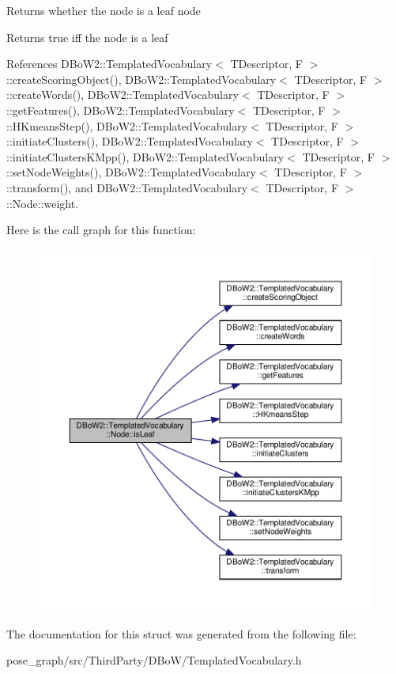 Returns whether the node is a leaf node \begin{DoxyReturn}{Returns}
true iff the node is a leaf 
\end{DoxyReturn}


References D\+Bo\+W2\+::\+Templated\+Vocabulary$<$ T\+Descriptor, F $>$\+::create\+Scoring\+Object(), D\+Bo\+W2\+::\+Templated\+Vocabulary$<$ T\+Descriptor, F $>$\+::create\+Words(), D\+Bo\+W2\+::\+Templated\+Vocabulary$<$ T\+Descriptor, F $>$\+::get\+Features(), D\+Bo\+W2\+::\+Templated\+Vocabulary$<$ T\+Descriptor, F $>$\+::\+H\+Kmeans\+Step(), D\+Bo\+W2\+::\+Templated\+Vocabulary$<$ T\+Descriptor, F $>$\+::initiate\+Clusters(), D\+Bo\+W2\+::\+Templated\+Vocabulary$<$ T\+Descriptor, F $>$\+::initiate\+Clusters\+K\+Mpp(), D\+Bo\+W2\+::\+Templated\+Vocabulary$<$ T\+Descriptor, F $>$\+::set\+Node\+Weights(), D\+Bo\+W2\+::\+Templated\+Vocabulary$<$ T\+Descriptor, F $>$\+::transform(), and D\+Bo\+W2\+::\+Templated\+Vocabulary$<$ T\+Descriptor, F $>$\+::\+Node\+::weight.

Here is the call graph for this function\+:\nopagebreak
\begin{figure}[H]
\begin{center}
\leavevmode
\includegraphics[width=350pt]{structDBoW2_1_1TemplatedVocabulary_1_1Node_a050a0ee173dd58475dd2ab84e6f215e8_cgraph}
\end{center}
\end{figure}


The documentation for this struct was generated from the following file\+:\begin{DoxyCompactItemize}
\item 
pose\+\_\+graph/src/\+Third\+Party/\+D\+Bo\+W/Templated\+Vocabulary.\+h\end{DoxyCompactItemize}
